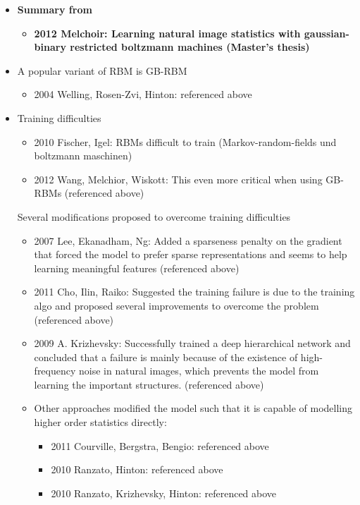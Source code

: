 \documentclass[twoside,english]{uiofysmaster}
\begin{document}
\begin{itemize}
	\item \textbf{Summary from}
	\begin{itemize}
		\item \textbf{2012 Melchoir: Learning natural image statistics with gaussian-binary restricted boltzmann machines (Master's thesis)} \cite{Melchior2012}
\end{itemize}
	\item A popular variant of RBM is GB-RBM
	\begin{itemize}
		\item 2004 Welling, Rosen-Zvi, Hinton: \cite{Welling2005} referenced above
	\end{itemize}
	\item Training difficulties
	\begin{itemize}
		\item 2010 Fischer, Igel: RBMs difficult to train (Markov-random-fields und boltzmann maschinen)
		\item 2012 Wang, Melchior, Wiskott: This even more critical when using GB-RBMs (referenced above) \cite{Wang2012}
	\end{itemize}
	Several modifications proposed to overcome training difficulties
	\begin{itemize}
		\item 2007 Lee, Ekanadham, Ng: Added a sparseness penalty on the gradient that forced the model to prefer sparse representations and seems to help learning meaningful features (referenced above) \cite{Lee2008}
		\item 2011 Cho, Ilin, Raiko: Suggested the training failure is due to the training algo and proposed several improvements to overcome the problem (referenced above) \cite{Cho2011}
		\item 2009 A. Krizhevsky: Successfully trained a deep hierarchical network and concluded that a failure is mainly because of the existence of high-frequency noise in natural images, which prevents the model from learning the important structures. (referenced above) \cite{Krizhevsky2009}
		\item Other approaches modified the model such that it is capable of modelling higher order statistics directly:
		\begin{itemize}
			\item 2011 Courville, Bergstra, Bengio: referenced above \cite{Courville2011}
			\item 2010 Ranzato, Hinton: referenced above \cite{Ranzato2010a}
			\item 2010 Ranzato, Krizhevsky, Hinton: referenced above \cite{Ranzato2010}

\end{itemize}
\end{itemize}
\end{itemize}
\end{document}
